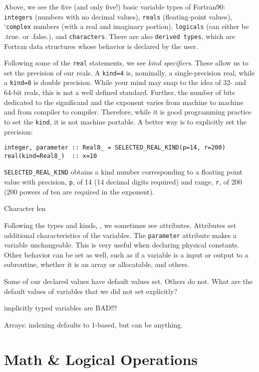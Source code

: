 \documentclass[11pt, letterpaper]{article}
\begin{document}
Above, we see the five (and only five!) basic variable types of Fortran90:
\texttt{integers} (numbers with no decimal values), \texttt{reals} (floating-point
values), `\texttt{complex} numbers (with a real and imaginary portion),
\texttt{logicals} (can either be .true. or .false.), and \texttt{characters}.  There
are also \texttt{derived types}, which are Fortran data structures whose
behavior is declared by the user.

Following some of the \texttt{real} statements, we see \emph{kind specifiers}.
These allow us to set the precision of our reals.  A \texttt{kind=4} is,
nominally, a single-precision real, while a \texttt{kind=8} is double precision.
While your mind may snap to the idea of 32- and 64-bit reals, this is not
a well defined standard.  Further, the number of bits dedicated to the
significand and the exponent varies from machine to machine and from
compiler to compiler.  Therefore, while it is good programming practice to
set the \texttt{kind}, it is not machine portable.  A better way is to explicitly
set the precision:
\begin{verbatim}
integer, parameter :: Real8_ = SELECTED_REAL_KIND(p=14, r=200)
real(kind=Real8_)  :: x=10
\end{verbatim}
\texttt{SELECTED\_REAL\_KIND} obtains a kind number corresponding to a floating
point value with precision, \texttt{p}, of 14 (14 decimal digits required) and
range, \texttt{r}, of 200 (200 powers of ten are required in the exponent).

Character len

Following the types and kinds, , we sometimes see attributes.  Attributes set
additional characteristics of the variables.  The \texttt{parameter} attribute
makes a variable unchangeable.  This is very useful when declaring physical
constants.  Other behavior can be set as well, such as if a variable is a input
or output to a subroutine, whether it is an array or allocatable, and others.

Some of our declared values have default values set.  Others do not.  What
are the default values of variables that we did not set explicitly?

implicitly typed variables are BAD!!!

Arrays: indexing defaults to 1-based, but can be anything.

\section{Math \& Logical Operations}
\end{document}
